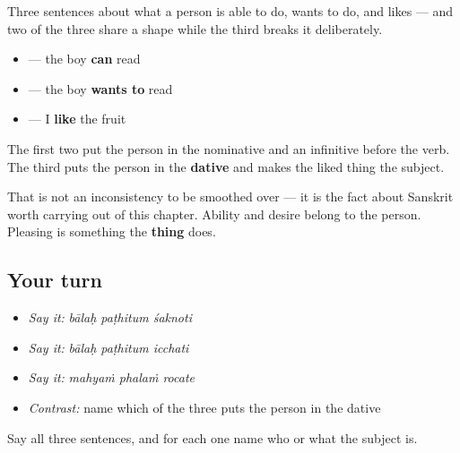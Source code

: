 \begin{grammarlens}[title={What you've built}]
Three sentences about what a person is able to do, wants to do, and likes — and two of the three share a shape while the third breaks it deliberately.

\begin{itemize}
\raggedright
  \item \textbf{  } — the boy \textbf{can} read
  \item \textbf{  } — the boy \textbf{wants to} read
  \item \textbf{  } — I \textbf{like} the fruit
\end{itemize}

The first two put the person in the nominative and an infinitive before the verb. The third puts the person in the \textbf{dative} and makes the liked thing the subject.

That is not an inconsistency to be smoothed over — it is the fact about Sanskrit worth carrying out of this chapter. Ability and desire belong to the person. Pleasing is something the \textbf{thing} does.
\end{grammarlens}

\subsection*{Your turn}
\begin{itemize}
\raggedright
  \item \emph{Say it:} \emph{bālaḥ paṭhitum śaknoti}
  \item \emph{Say it:} \emph{bālaḥ paṭhitum icchati}
  \item \emph{Say it:} \emph{mahyaṁ phalaṁ rocate}
  \item \emph{Contrast:} name which of the three puts the person in the dative
\end{itemize}

\begin{tcolorbox}[breakable,colback=teal!4,colframe=teal!35!black,title={Before you move on}]
Say all three sentences, and for each one name who or what the subject is.
\end{tcolorbox}
